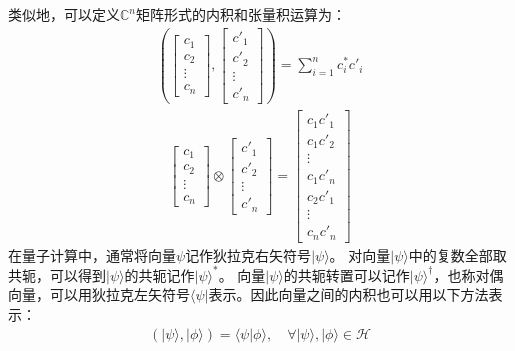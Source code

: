 类似地，可以定义\(\mathbb{C}^n\)矩阵形式的内积和张量积运算为：
\begin{align}
    \left(\left[\begin{matrix}
        c_1\\c_2\\\vdots\\c_n
    \end{matrix}\right]
    ,\left[\begin{matrix}
        c'_1\\c'_2\\\vdots\\c'_n
    \end{matrix}\right]\right)=
    \sum_{i=1}^{n}c_i^* c'_i
\end{align}
\begin{align}
    \left[\begin{matrix}
        c_1\\c_2\\\vdots\\c_n
    \end{matrix}\right]
    \otimes\left[\begin{matrix}
        c'_1\\c'_2\\\vdots\\c'_n
    \end{matrix}\right]=\left[\begin{matrix}
        c_1c'_1\\c_1c'_2\\\vdots\\c_1c'_n\\c_2c'_1\\\vdots\\c_n c'_n
    \end{matrix}\right]
\end{align}
在量子计算中，通常将向量\(\psi\)记作狄拉克右矢符号\(|\psi\rangle\)。
对向量\(|\psi\rangle\)中的复数全部取共轭，可以得到\(|\psi\rangle\)的共轭记作\(|\psi\rangle^*\)。
向量\(|\psi\rangle\)的共轭转置可以记作\(|\psi\rangle^\dagger\)，也称对偶向量，可以用狄拉克左矢符号\(\langle\psi|\)表示。因此向量之间的内积也可以用以下方法表示：
\begin{align}
    (|\psi\rangle, |\phi\rangle)=\langle \psi|\phi\rangle ,\quad \forall |\psi \rangle, |\phi \rangle\in \mathcal{H}
\end{align}

